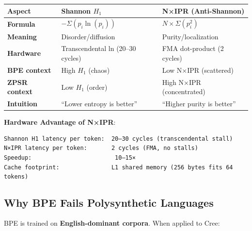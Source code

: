 \documentclass[11pt,oneside]{article}
\begin{document}
\begin{center}
\begin{tabular}{lll}
\toprule
Aspect & Shannon $H_1$ & N×IPR (Anti-Shannon) \\
\midrule
\textbf{Formula} & $-\Sigma(p_i \ln(p_i))$ & $N \times \Sigma(p_i^2)$ \\
\textbf{Meaning} & Disorder/diffusion & Purity/localization \\
\textbf{Hardware} & Transcendental ln (20--30 cycles) & FMA dot-product (2 cycles) \\
\textbf{BPE context} & High $H_1$ (chaos) & Low N×IPR (scattered) \\
\textbf{ZPSR context} & Low $H_1$ (order) & High N×IPR (concentrated) \\
\textbf{Intuition} & ``Lower entropy is better'' & ``Higher purity is better'' \\
\bottomrule
\end{tabular}
\end{center}

\textbf{Hardware Advantage of N×IPR}:
\begin{lstlisting}
Shannon H1 latency per token:  20–30 cycles (transcendental stall)
N×IPR latency per token:       2 cycles (FMA, no stalls)
Speedup:                        10–15×
Cache footprint:               L1 shared memory (256 bytes fits 64 tokens)
\end{lstlisting}

\subsection{Why BPE Fails Polysynthetic Languages}

BPE is trained on \textbf{English-dominant corpora}. When applied to Cree:
\end{document}
